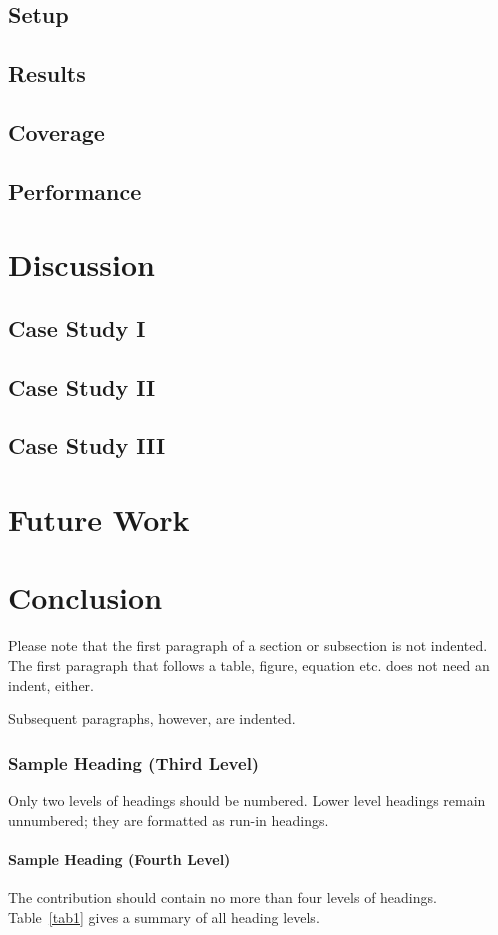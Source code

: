\documentclass[runningheads]{llncs}
\begin{document}
\subsection{Setup}
\subsection{Results}
\subsection{Coverage}
\subsection{Performance}
\section{Discussion}
\subsection{Case Study I}
\subsection{Case Study II}
\subsection{Case Study III}
\section{Future Work}
\section{Conclusion}
Please note that the first paragraph of a section or subsection is
not indented. The first paragraph that follows a table, figure,
equation etc. does not need an indent, either.

Subsequent paragraphs, however, are indented.

\subsubsection{Sample Heading (Third Level)} Only two levels of
headings should be numbered. Lower level headings remain unnumbered;
they are formatted as run-in headings.

\paragraph{Sample Heading (Fourth Level)}
The contribution should contain no more than four levels of
headings. Table~\ref{tab1} gives a summary of all heading levels.
\end{document}
